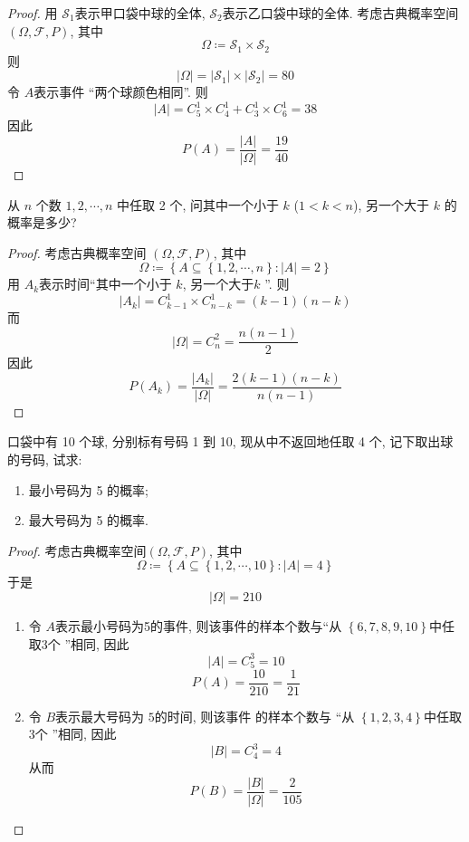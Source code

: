 \documentclass[../main.tex]{subfiles}
\begin{document}
\begin{proof}
    用 \(  \mathcal{S}_{1}  \)表示甲口袋中球的全体, \(  \mathcal{S}_{2}  \)表示乙口袋中球的全体. 考虑古典概率空间 \(  \left(  \Omega  ,\mathcal{F},P \right)   \), 其中 \[
     \Omega \coloneqq \mathcal{S}_{1}\times \mathcal{S}_{2}
    \] 则 \[
    \left|  \Omega  \right|= \left| \mathcal{S}_{1} \right|\times \left| \mathcal{S}_{2} \right|= 80   
    \]令 \(  A  \)表示事件 ``两个球颜色相同''. 则 \[
    \left| A \right|= C_{5}^{1}\times C_{4}^{1}+ C_{3}^{1}\times C_{6}^{1}= 38 
    \] 因此 \[
    P\left( A \right)= \frac{\left| A \right|  }{\left|  \Omega  \right|  }= \frac{19 }{40 }   
    \]
\end{proof}
\begin{exercise}{}{}
从 $n$ 个数 $1,2,\cdots,n$ 中任取 2 个, 问其中一个小于 $k$ ($1<k<n$), 另一个大于 $k$ 的概率是多少?
\end{exercise}
\begin{proof}
    考虑古典概率空间 \(  \left(  \Omega ,\mathcal{F},P \right)   \), 其中 \[
     \Omega \coloneqq \left\{ A\subseteq \left\{ 1,2,\cdots ,n \right\}: \left| A \right|= 2  \right\}
    \] 用 \(  A_{k}  \)表示时间``其中一个小于 \(  k  \), 另一个大于\(  k  \)  ''. 则 \[
    \left| A_{k} \right|= C_{k-1}^{1}\times C_{n-k}^{1}= \left( k-1 \right)\left( n-k \right)   
    \]而 \[
    \left|  \Omega  \right|= C_{n}^{2}= \frac{n\left( n-1 \right)  }{2 }  
    \] 因此 \[
    P\left( A_{k} \right)= \frac{\left| A_{k} \right|  }{\left|  \Omega  \right|  }= \frac{2\left( k-1 \right)\left( n-k \right)   }{n\left( n-1 \right)  }   
    \]
\end{proof}
\begin{exercise}{}{}
口袋中有 10 个球, 分别标有号码 1 到 10, 现从中不返回地任取 4 个, 记下取出球的号码, 试求:
\begin{enumerate}
\item 最小号码为 5 的概率;
\item 最大号码为 5 的概率.
\end{enumerate}
\end{exercise}
\begin{proof}
    考虑古典概率空间\(  \left(  \Omega ,\mathcal{F},P \right)   \), 其中 \[
     \Omega \coloneqq \left\{ A\subseteq \left\{ 1,2,\cdots ,10 \right\}:\left| A \right|= 4  \right\}
    \] 于是 \[
    \left|  \Omega  \right|=210
    \]
    \begin{enumerate}
        \item 令 \(  A  \)表示最小号码为5的事件, 则该事件的样本个数与``从 \(  \left\{ 6,7,8,9,10 \right\}  \)中任取3个 ''相同, 因此 \[
        \left| A \right|= C_{5}^{3}= 10
        \]  \[
        P\left( A \right)= \frac{10 }{210 }= \frac{1 }{21 }   
        \]
        \item 令 \(  B  \)表示最大号码为 \(  5  \)的时间, 则该事件 的样本个数与 ``从 \(  \left\{ 1,2,3,4 \right\}  \)中任取3个 ''相同, 因此 \[
        \left| B \right|= C_{4}^{3}= 4
        \]从而 \[
        P\left( B \right)= \frac{\left| B \right|  }{\left|  \Omega  \right|  }= \frac{2 }{105 }   
        \]  
    \end{enumerate}
    
\end{proof}
\end{document}
